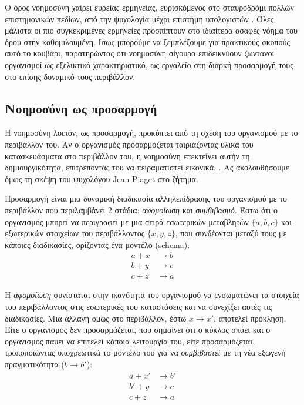   Ο όρος νοημοσύνη χαίρει ευρείας ερμηνείας, ευρισκόμενος στο σταυροδρόμι πολλών επιστημονικών πεδίων, από την ψυχολογία μέχρι επιστήμη υπολογιστών
  \parencite{leggCollectionDefinitionsIntelligence2007}.
  Όλες μάλιστα οι πιο συγκεκριμένες ερμηνείες προσπίπτουν στο ιδιαίτερα ασαφές νόημα του όρου στην καθομιλουμένη.
  Ίσως μπορούμε να ξεμπλέξουμε για πρακτικούς σκοπούς αυτό το κουβάρι, παρατηρώντας ότι νοημοσύνη σίγουρα επιδεικνύουν ζωντανοί οργανισμοί ως εξελικτικό χαρακτηριστικό,
  ως εργαλείο στη διαρκή προσαρμογή τους στο επίσης δυναμικό τους περιβάλλον.

\subsection*{Νοημοσύνη ως προσαρμογή}

  Η νοημοσύνη λοιπόν, ως προσαρμογή, προκύπτει από τη σχέση του οργανισμού με το περιβάλλον του.
  Αν ο οργανισμός προσαρμόζεται ταιριάζοντας υλικά του κατασκευάσματα στο περιβάλλον του, η νοημοσύνη επεκτείνει αυτήν τη δημιουργικότητα, επιτρέποντάς του να πειραματιστεί εικονικά.
  \parencite[σελ 3]{piagetOriginsIntelligenceChildren1952}.
  Ας ακολουθήσουμε όμως τη σκέψη του ψυχολόγου Jean Piaget στο ζήτημα.

  Προσαρμογή είναι μια δυναμική διαδικασία αλληλεπίδρασης του οργανισμού με το περιβάλλον που περιλαμβάνει 2 στάδια: \textit{αφομοίωση} και \textit{συμβιβασμό}.
  Έστω ότι ο οργανισμός μπορεί να περιγραφεί με μια σειρά εσωτερικών μεταβλητών $\{a,b,c\}$ και εξωτερικών στοιχείων του περιβάλλοντος $\{x,y,z\}$,
  που συνδέονται μεταξύ τους με κάποιες διαδικασίες, ορίζοντας ένα μοντέλο (schema):
  \begin{align*}
    a + x &\rightarrow b\\
    b + y &\rightarrow c\\
    c + z &\rightarrow a
  \end{align*}

  Η \textit{αφομοίωση} συνίσταται στην ικανότητα του οργανισμού να ενσωματώνει τα στοιχεία του περιβάλλοντος στις εσωτερικές του καταστάσεις και να συνεχίζει αυτές τις διαδικασίες.
  Μια αλλαγή όμως στο περιβάλλον, έστω $x\rightarrow x'$, αποτελεί πρόκληση.
  Είτε ο οργανισμός δεν προσαρμόζεται, που σημαίνει ότι ο κύκλος σπάει και ο οργανισμός παύει να επιτελεί κάποια λειτουργία του,
  είτε προσαρμόζεται, τροποποιώντας υποχρεωτικά το μοντέλο του για να \textit{συμβιβαστεί} με τη νέα εξωγενή πραγματικότητα ($b\rightarrow b'$):
  \begin{align*}
    a  + x' &\rightarrow b'\\
    b' + y  &\rightarrow c\\
    c  + z  &\rightarrow a
  \end{align*}

